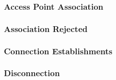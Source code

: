 


\subsubsection*{Access Point Association}

\subsubsection*{Association Rejected}

\subsubsection*{Connection Establishments}

\subsubsection*{Disconnection}




